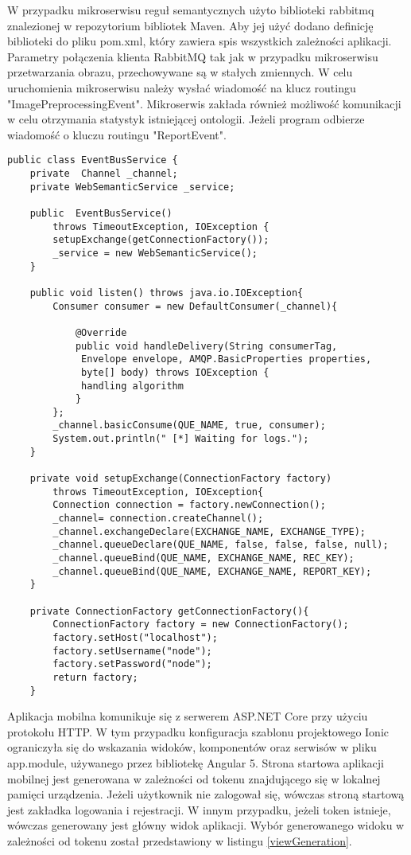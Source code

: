 W przypadku mikroserwisu reguł semantycznych użyto biblioteki rabbitmq znalezionej w repozytorium bibliotek Maven. Aby jej użyć dodano definicję biblioteki do pliku pom.xml, który zawiera spis wszystkich zależności aplikacji. Parametry połączenia klienta RabbitMQ tak jak w przypadku mikroserwisu przetwarzania obrazu, przechowywane są w stałych zmiennych. W celu uruchomienia mikroserwisu należy wysłać wiadomość na klucz routingu "ImagePreprocessingEvent". Mikroserwis zakłada również możliwość komunikacji w celu otrzymania statystyk istniejącej ontologii. Jeżeli program odbierze wiadomość o kluczu routingu "ReportEvent".
\begin{lstlisting}[caption={Klient RabbitMQ dla mikroserwisu reguł semantycznych.}]
public class EventBusService {
	private  Channel _channel;	
	private WebSemanticService _service;
	
	public  EventBusService() 
		throws TimeoutException, IOException {
		setupExchange(getConnectionFactory());
		_service = new WebSemanticService();
	}
	
	public void listen() throws java.io.IOException{
		Consumer consumer = new DefaultConsumer(_channel){
			
			@Override
			public void handleDelivery(String consumerTag,
			 Envelope envelope, AMQP.BasicProperties properties, 
			 byte[] body) throws IOException {
			 handling algorithm
			}
		};
		_channel.basicConsume(QUE_NAME, true, consumer);
		System.out.println(" [*] Waiting for logs.");
	}
	
	private void setupExchange(ConnectionFactory factory) 
		throws TimeoutException, IOException{
		Connection connection = factory.newConnection();
		_channel= connection.createChannel();
		_channel.exchangeDeclare(EXCHANGE_NAME, EXCHANGE_TYPE);
		_channel.queueDeclare(QUE_NAME, false, false, false, null);
		_channel.queueBind(QUE_NAME, EXCHANGE_NAME, REC_KEY);
		_channel.queueBind(QUE_NAME, EXCHANGE_NAME, REPORT_KEY);
	}
	
	private ConnectionFactory getConnectionFactory(){
		ConnectionFactory factory = new ConnectionFactory();
		factory.setHost("localhost");
		factory.setUsername("node");
		factory.setPassword("node");
		return factory;
	}
\end{lstlisting}
Aplikacja mobilna komunikuje się z serwerem ASP.NET Core przy użyciu protokołu HTTP. W tym przypadku konfiguracja szablonu projektowego Ionic ograniczyła się do wskazania widoków, komponentów oraz serwisów w pliku app.module, używanego przez bibliotekę Angular 5. Strona startowa aplikacji mobilnej jest generowana w zależności od tokenu znajdującego się w lokalnej pamięci urządzenia. Jeżeli użytkownik nie zalogował się, wówczas stroną startową jest zakładka logowania i rejestracji. W innym przypadku, jeżeli token istnieje, wówczas generowany jest główny widok aplikacji. Wybór generowanego widoku w zależności od tokenu został przedstawiony w listingu \ref{viewGeneration}.
